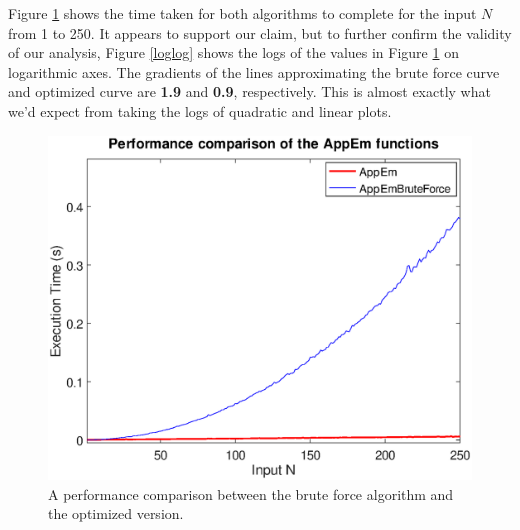 \documentclass[10pt]{article}
\begin{document}
Figure \ref{fig:emnaive_vs_better} shows   the time taken for both algorithms to complete for the input $N$ from 1 to 250. It appears to support our claim, but to further confirm the validity of our analysis, Figure \ref{loglog} shows the logs of the values in Figure \ref{fig:emnaive_vs_better} on logarithmic axes. The gradients of the lines approximating the brute force curve and optimized curve are \textbf{1.9} and \textbf{0.9}, respectively. This is almost exactly what we'd expect from taking the logs of quadratic and linear plots.

\begin{figure}[!hb]

   \includegraphics[scale=0.5]{bruteforce_vs_better.eps}

   \caption{A performance comparison between the brute force algorithm and the optimized version.}
      \label{fig:emnaive_vs_better}
\end{figure}
\end{document}
